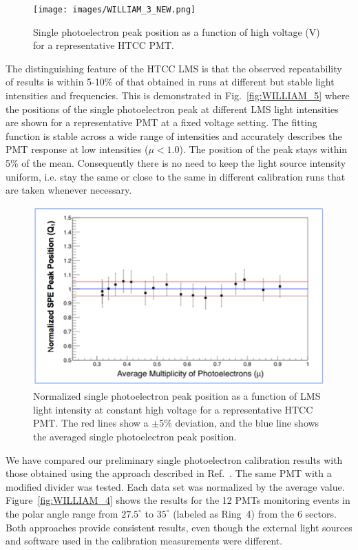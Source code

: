 \begin{figure}[ht]
\centering
\texttt{[image: images/WILLIAM\_3\_NEW.png]}
\caption{Single photoelectron peak position as a function of high voltage (V) for a representative HTCC PMT.}
\label{fig:WILLIAM_3_NEW}
\end{figure}

The distinguishing feature of the HTCC LMS is that the observed repeatability of results is within 5-10\% of that
obtained in runs at different but stable light intensities and frequencies. This is demonstrated in
Fig.~\ref{fig:WILLIAM_5} where the positions of the single photoelectron peak at different LMS light
intensities are shown for a representative PMT at a fixed voltage setting. The fitting function is stable across a
wide range of intensities and accurately describes the PMT response at low intensities ($\mu<1.0$). The position of
the peak stays within 5\% of the mean. Consequently there is no need to keep the light source intensity uniform, i.e.
stay the same or close to the same in different calibration runs that are taken whenever necessary.

\begin{figure}[ht]
\centering
\includegraphics[width=0.99\linewidth]{images/WILLIAM_5_modif.png}
\caption{Normalized single photoelectron peak position as a function of LMS light intensity at constant high voltage for a
  representative HTCC PMT. The red lines show a $\pm$5\% deviation, and the blue line shows the averaged
  single photoelectron peak position.}
\label{fig:WILLIAM_5_modif}
\end{figure}

We have compared our preliminary single photoelectron calibration results with those obtained using the
approach described in Ref.~\cite{degtiarenko2017}. The same PMT with a modified divider was tested. Each data
set was normalized by the average value. Figure~\ref{fig:WILLIAM_4} shows the results for the 12 PMTs monitoring
events in the polar angle range from $27.5^\circ$ to $35^\circ$ (labeled as Ring~4) from the 6 sectors. Both approaches
provide consistent results, even though the external light sources and software used in the calibration measurements
were different.

